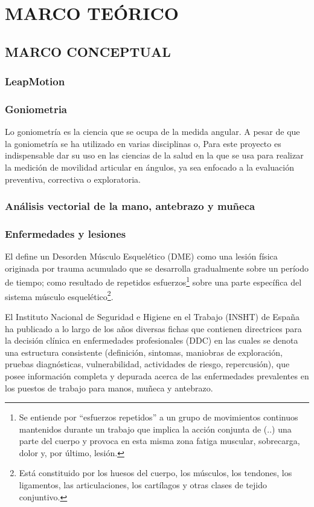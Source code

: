 \chapter{MARCO TEÓRICO}
\section{MARCO CONCEPTUAL}
\subsection{LeapMotion}
\subsection{Goniometria}
Lo goniometría es la ciencia que se ocupa de la medida angular. A pesar de que la goniometría se ha utilizado en varias disciplinas o, Para este proyecto es indispensable dar su uso en las ciencias de la salud en la que se usa para realizar la medición de movilidad articular en ángulos, ya sea enfocado a la evaluación preventiva, correctiva o exploratoria.


\subsection{Análisis vectorial de la mano, antebrazo y muñeca}

\subsection{Enfermedades y lesiones}
El \parencite{MinisteriodeProteccionSocialdeColombia2006GuiaSuperiores} define un Desorden Músculo Esquelético (DME) como una lesión física originada por trauma acumulado que se desarrolla gradualmente sobre un período de tiempo; como resultado de repetidos esfuerzos\footnote{Se entiende por “esfuerzos repetidos” a un grupo de movimientos continuos mantenidos durante un trabajo que implica la acción conjunta de (..) una parte del cuerpo y provoca en esta misma zona fatiga muscular, sobrecarga, dolor y, por último, lesión.\parencite{INSHT2016PrevencionRepetidos}} sobre una parte específica del sistema músculo esquelético\footnote{Está constituido por los huesos del cuerpo, los músculos, los tendones, los ligamentos, las articulaciones, los cartílagos y otras clases de tejido conjuntivo.}. 

El Instituto Nacional de Seguridad e Higiene en el Trabajo (INSHT) de España ha publicado a lo largo de los años diversas fichas que contienen directrices para la decisión clínica en enfermedades profesionales (DDC) en las cuales se denota una estructura consistente (definición, sintomas, maniobras de exploración, pruebas diagnósticas, vulnerabilidad, actividades de riesgo, repercusión), que posee información completa y depurada acerca de las enfermedades prevalentes en los puestos de trabajo para manos, muñeca y antebrazo.

